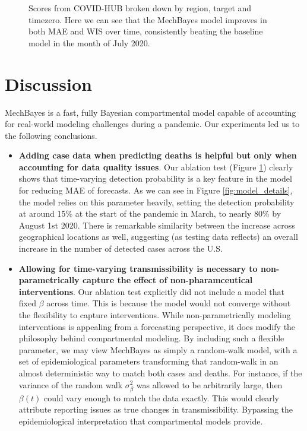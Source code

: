 \documentclass[11pt]{amsart}
\begin{document}
\begin{figure}
\caption{Scores from COVID-HUB broken down by region, target and timezero. Here we can see that the MechBayes model improves in both MAE and WIS over time, consistently beating the baseline model in the month of July 2020.  }
\label{fig:ablation}
\end{figure}




\section{Discussion}

MechBayes is a fast, fully Bayesian compartmental model capable of accounting for real-world modeling challenges during a pandemic. Our experiments led us to the following conclusions.

\begin{itemize}
\item \textbf{Adding case data when predicting deaths is helpful but only when accounting for data quality issues}. Our ablation test (Figure \ref{fig:ablation}) clearly shows that time-varying detection probability is a key feature in the model for reducing MAE of forecasts. As we can see in Figure \ref{fig:model_details}, the model relies on this parameter heavily, setting the detection probability at around 15\% at the start of the pandemic in March, to nearly 80\% by August 1st 2020. There is remarkable similarity between the increase across geographical locations as well, suggesting (as testing data reflects) an overall increase in the number of detected cases across the U.S. 

\item \textbf{Allowing for time-varying transmissibility is necessary to non-parametrically capture the effect of non-pharamceutical interventions}. Our ablation test explicitly did not include a model that fixed $\beta$ across time. This is because the model would not converge without the flexibility to capture interventions. While non-parametrically modeling interventions is appealing from a forecasting perspective, it does modify the philosophy behind compartmental modeling. By including such a flexible parameter, we may view MechBayes as simply a random-walk model, with a set of epidemiological parameters transforming that random-walk in an almost deterministic way to match both cases and deaths. For instance, if the variance of the random walk $\sigma_{\beta}^2$ was allowed to be arbitrarily large, then $\beta(t)$ could vary enough to match the data exactly. This would clearly attribute reporting issues as true changes in transmissibility. Bypassing the epidemiological interpretation that compartmental models provide. 


\end{itemize}
\end{document}
